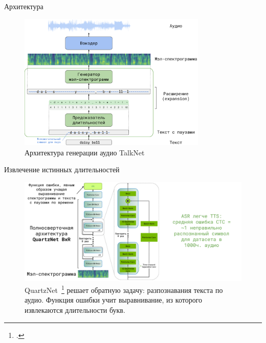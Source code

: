 \begin{frame}{Архитектура}
\begin{figure}[H]
\centering
\includegraphics[width=0.8\textwidth]{images/arch-rus.png}
\caption{Архитектура генерации аудио TalkNet}
\end{figure}
\end{frame}

\begin{frame}{Извлечение истинных длительностей}
\renewcommand{\thefootnote}{4}
\begin{figure}[H]
\centering
\includegraphics[width=1.0\textwidth]{images/qn-rus.png}
\caption{QuartzNet~\footcite{quartznet} решает обратную задачу: разпознавания текста по аудио. Функция ошибки учит выравнивание, из которого извлекаются длительности букв.}
\end{figure}
\end{frame}


